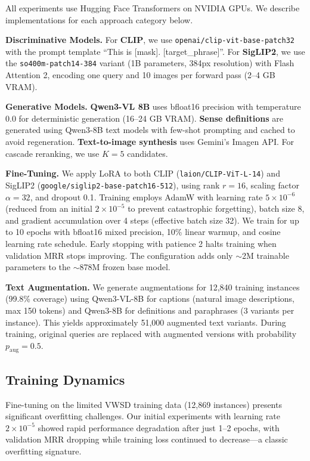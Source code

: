 \documentclass[11pt]{article}
\begin{document}
All experiments use Hugging Face Transformers on NVIDIA GPUs. We describe implementations for each approach category below.

\textbf{Discriminative Models.} For \textbf{CLIP}, we use \texttt{openai/clip-vit-base-patch32} with the prompt template ``This is [mask]. [target\_phrase]''. For \textbf{SigLIP2}, we use the \texttt{so400m-patch14-384} variant (1B parameters, 384px resolution) with Flash Attention 2, encoding one query and 10 images per forward pass (2--4 GB VRAM).

\textbf{Generative Models.} \textbf{Qwen3-VL 8B} uses bfloat16 precision with temperature 0.0 for deterministic generation (16--24 GB VRAM). \textbf{Sense definitions} are generated using Qwen3-8B text models with few-shot prompting and cached to avoid regeneration. \textbf{Text-to-image synthesis} uses Gemini's Imagen API. For cascade reranking, we use $K=5$ candidates.

\textbf{Fine-Tuning.} We apply LoRA to both CLIP (\texttt{laion/CLIP-ViT-L-14}) and SigLIP2 (\texttt{google/siglip2-base-patch16-512}), using rank $r=16$, scaling factor $\alpha=32$, and dropout 0.1. Training employs AdamW with learning rate $5 \times 10^{-6}$ (reduced from an initial $2 \times 10^{-5}$ to prevent catastrophic forgetting), batch size 8, and gradient accumulation over 4 steps (effective batch size 32). We train for up to 10 epochs with bfloat16 mixed precision, 10\% linear warmup, and cosine learning rate schedule. Early stopping with patience 2 halts training when validation MRR stops improving. The configuration adds only $\sim$2M trainable parameters to the $\sim$878M frozen base model.

\textbf{Text Augmentation.} We generate augmentations for 12,840 training instances (99.8\% coverage) using Qwen3-VL-8B for captions (natural image descriptions, max 150 tokens) and Qwen3-8B for definitions and paraphrases (3 variants per instance). This yields approximately 51,000 augmented text variants. During training, original queries are replaced with augmented versions with probability $p_{\text{aug}}=0.5$.

\subsection{Training Dynamics}

Fine-tuning on the limited VWSD training data (12,869 instances) presents significant overfitting challenges. Our initial experiments with learning rate $2 \times 10^{-5}$ showed rapid performance degradation after just 1--2 epochs, with validation MRR dropping while training loss continued to decrease---a classic overfitting signature.
\end{document}
